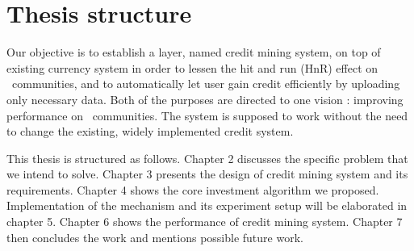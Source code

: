 \section{Thesis structure}
Our objective is to establish a layer, named credit mining system, on top of existing currency system in order to lessen the hit and run (HnR) effect on \bt~communities, and to automatically let user gain credit efficiently by uploading only necessary data. Both of the purposes are directed to one vision : improving performance on \bt~communities. The system is supposed to work without the need to change the existing, widely implemented credit system.

This thesis is structured as follows. Chapter 2 discusses the specific problem that we intend to solve. Chapter 3 presents the design of credit mining system and its requirements. Chapter 4 shows the core investment algorithm we proposed. Implementation of the mechanism and its experiment setup will be elaborated in chapter 5. Chapter 6 shows the performance of credit mining system. Chapter 7 then concludes the work and mentions possible future work.


